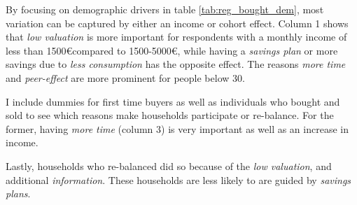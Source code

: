 \documentclass[ProjectABM]{subfiles}
\begin{document}


By focusing on demographic drivers in table \ref{tab:reg_bought_dem}, most variation can be captured by either an income or cohort effect. Column 1 shows that \textit{low valuation} is more important for respondents with a monthly income of less than 1500\euro compared to 1500-5000\euro, while having a \textit{savings plan} or more savings due to \textit{less consumption} has the opposite effect. The reasons \textit{more time} and \textit{peer-effect} are more prominent for people below 30.

I include dummies for first time buyers as well as individuals who bought and sold to see which reasons make households participate or re-balance. For the former, having \textit{more time} (column 3) is very important as well as an increase in income. %

Lastly, households who re-balanced did so because of the \textit{low valuation}, and additional \textit{information}. These households are less likely to are guided by \textit{savings plans}.


\end{document}
